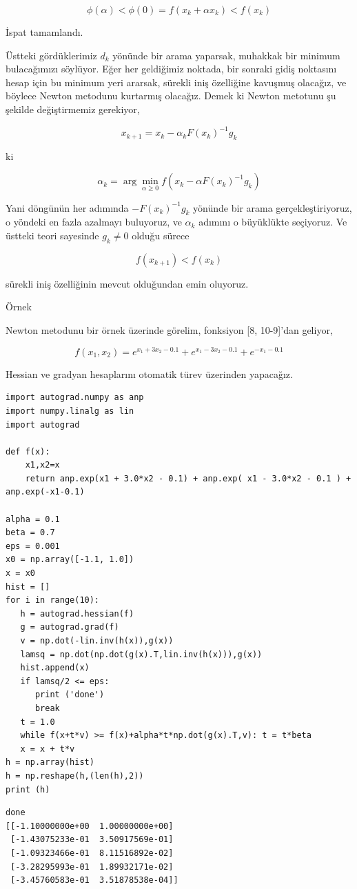 \documentclass[12pt,fleqn]{article}\usepackage{../../common}
\begin{document}
$$
\phi(\alpha) < \phi(0) =  f(x_k + \alpha x_k) < f(x_k)
$$

İspat tamamlandı.

Üstteki gördüklerimiz $d_k$ yönünde bir arama yaparsak, muhakkak bir
minimum bulacağımızı söylüyor. Eğer her geldiğimiz noktada, bir sonraki
gidiş noktasını hesap için bu minimum yeri ararsak, sürekli iniş özelliğine
kavuşmuş olacağız, ve böylece Newton metodunu kurtarmış olacağız. Demek ki
Newton metotunu şu şekilde değiştirmemiz gerekiyor, 

$$
x_{k+1} = x_k - \alpha_k F(x_k)^{-1} g_k
$$

ki 

$$
\alpha_k = \arg\min_{\alpha \ge 0} f(x_k -\alpha F(x_k)^{-1} g_k)
$$

Yani döngünün her adımında $-F(x_k)^{-1} g_k$ yönünde bir arama
gerçekleştiriyoruz, o yöndeki en fazla azalmayı buluyoruz, ve $\alpha_k$
adımını o büyüklükte seçiyoruz. Ve üstteki teori sayesinde $g_k \ne 0$
olduğu sürece 

$$
f(x_{k+1}) < f(x_k)
$$

sürekli iniş özelliğinin mevcut olduğundan emin oluyoruz. 

Örnek

Newton metodunu bir örnek üzerinde görelim, fonksiyon [8, 10-9]'dan
geliyor, 

$$
f(x_1,x_2) = e^{x_1 + 3x_2 - 0.1} + e^{x_1 - 3x_2 - 0.1} + e^{-x_1 - 0.1}
$$

Hessian ve gradyan hesaplarını otomatik türev üzerinden yapacağız. 

\begin{verbatim}
import autograd.numpy as anp
import numpy.linalg as lin
import autograd

def f(x):
    x1,x2=x
    return anp.exp(x1 + 3.0*x2 - 0.1) + anp.exp( x1 - 3.0*x2 - 0.1 ) + anp.exp(-x1-0.1)

alpha = 0.1
beta = 0.7
eps = 0.001
x0 = np.array([-1.1, 1.0])
x = x0
hist = []
for i in range(10):
   h = autograd.hessian(f)
   g = autograd.grad(f)
   v = np.dot(-lin.inv(h(x)),g(x))
   lamsq = np.dot(np.dot(g(x).T,lin.inv(h(x))),g(x))
   hist.append(x)
   if lamsq/2 <= eps:
      print ('done')
      break
   t = 1.0
   while f(x+t*v) >= f(x)+alpha*t*np.dot(g(x).T,v): t = t*beta
   x = x + t*v
h = np.array(hist)
h = np.reshape(h,(len(h),2))
print (h)
\end{verbatim}

\begin{verbatim}
done
[[-1.10000000e+00  1.00000000e+00]
 [-1.43075233e-01  3.50917569e-01]
 [-1.09323466e-01  8.11516892e-02]
 [-3.28295993e-01  1.89932171e-02]
 [-3.45760583e-01  3.51878538e-04]]
\end{verbatim}
\end{document}

